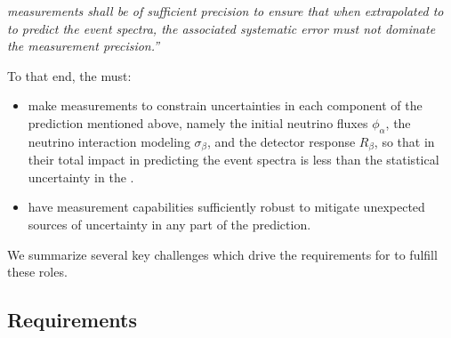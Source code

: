 {\em {} measurements shall be of sufficient precision to ensure that when extrapolated to  to predict the  event spectra, the associated systematic error must not dominate the measurement precision.''}

To that end, the  must:
\begin{itemize}
    \item make measurements to constrain uncertainties in each component of the  prediction mentioned above, namely the initial neutrino fluxes $\phi_\alpha$, the neutrino interaction modeling $\sigma_\beta$, and the detector response $R_\beta$, so that in their total impact in predicting the  event spectra is less than the statistical uncertainty in the . 
    \item have measurement capabilities sufficiently robust to mitigate unexpected sources of uncertainty in any part of the prediction. 
\end{itemize}

We summarize several key challenges which drive the requirements for  to fulfill these roles.

\subsection{Requirements} %
\label{intro:science:reqs}







